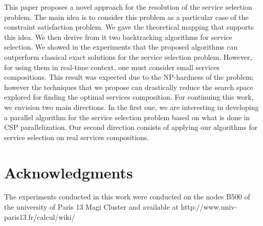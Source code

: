 \documentclass[a4paper]{article}
\begin{document}
This paper proposes a novel approach for the resolution of the service selection problem. 
The main idea is to consider this problem as a particular case of the constraint satisfaction 
problem. We gave the theoretical mapping that supports this idea. We then derive from it two backtracking 
algorithms for service selection. We showed in the experiments that the proposed algorithms can 
outperform classical exact solutions for the service selection problem. However, for using them in 
real-time context, one must consider small services compositions. This result was expected due to the 
NP-hardness of the problem; however the techniques that we propose can drastically reduce the search 
space explored for finding the optimal services composition. 
 For continuing this work, we envision 
two main directions. In the first one, we are interesting in developing a parallel algorithm for the 
service selection problem based on what is done in CSP parallelization. Our second direction consists of 
applying our algorithms for service selection on real services compositions. 

\section*{Acknowledgments}

The experiments conducted in this work were conducted on the nodes B500 of the university of Paris 13 
Magi Cluster and available at http://www.univ-paris13.fr/calcul/wiki/



\end{document}
